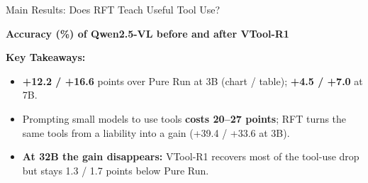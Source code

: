 \documentclass[aspectratio=169]{beamer}
\begin{document}
\begin{frame}{Main Results: Does RFT Teach Useful Tool Use?}
  \begin{center}
    \textbf{Accuracy (\%) of Qwen2.5-VL before and after VTool-R1}
    \vspace{0.15cm}

  \end{center}
  \vspace{0.2cm}
  \textbf{Key Takeaways:}
  \begin{itemize}\small
    \item \textcolor{medgreen}{\textbf{+12.2 / +16.6}} points over Pure Run at 3B (chart / table);
          \textcolor{medgreen}{\textbf{+4.5 / +7.0}} at 7B.
    \item Prompting small models to use tools \textcolor{alertred}{\textbf{costs 20--27 points}}; RFT turns the
          same tools from a liability into a gain (+39.4 / +33.6 at 3B).
    \item \textcolor{deepgold}{\textbf{At 32B the gain disappears:}} VTool-R1 recovers most of the tool-use drop
          but stays 1.3 / 1.7 points below Pure Run.
  \end{itemize}
\end{frame}
\end{document}
